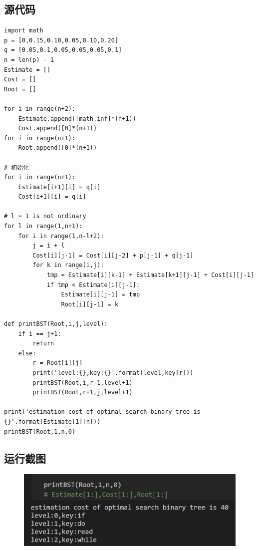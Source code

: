 \documentclass{ctexart}[UTF8]
\begin{document}
    \subsection{源代码}
    \begin{lstlisting}
import math
p = [0,0.15,0.10,0.05,0.10,0.20]
q = [0.05,0.1,0.05,0.05,0.05,0.1]
n = len(p) - 1
Estimate = []
Cost = []
Root = []

for i in range(n+2):
    Estimate.append([math.inf]*(n+1))
    Cost.append([0]*(n+1))
for i in range(n+1):
    Root.append([0]*(n+1))

# 初始化
for i in range(n+1):
    Estimate[i+1][i] = q[i]
    Cost[i+1][i] = q[i]

# l = 1 is not ordinary
for l in range(1,n+1):
    for i in range(1,n-l+2):
        j = i + l
        Cost[i][j-1] = Cost[i][j-2] + p[j-1] + q[j-1]
        for k in range(i,j):
            tmp = Estimate[i][k-1] + Estimate[k+1][j-1] + Cost[i][j-1]
            if tmp < Estimate[i][j-1]:
                Estimate[i][j-1] = tmp
                Root[i][j-1] = k

def printBST(Root,i,j,level):
    if i == j+1:
        return
    else:
        r = Root[i][j]
        print('level:{},key:{}'.format(level,key[r]))
        printBST(Root,i,r-1,level+1)
        printBST(Root,r+1,j,level+1)

print('estimation cost of optimal search binary tree is {}'.format(Estimate[1][n]))
printBST(Root,1,n,0)
\end{lstlisting}
\subsection{运行截图}
\begin{figure}[H]
    \centering
    \includegraphics[width=12cm]{resources/8_2.png}
\end{figure}
\end{document}
